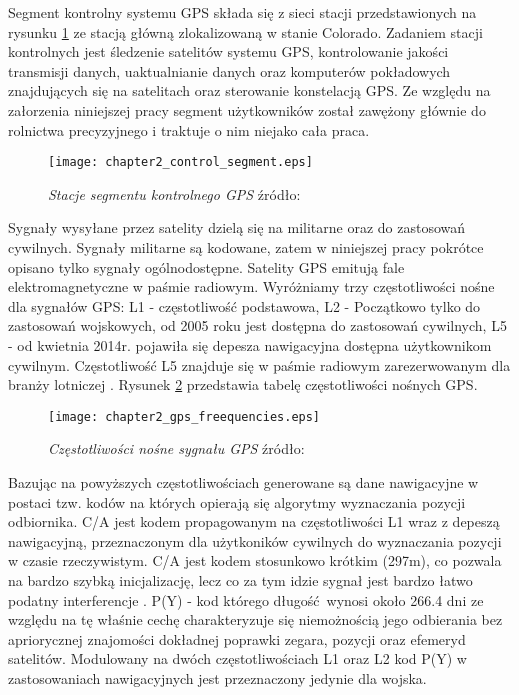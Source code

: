 \indent Segment kontrolny systemu GPS składa się z sieci stacji przedstawionych na rysunku \ref{fig:gps_control_segment} ze stacją główną zlokalizowaną w stanie Colorado.
Zadaniem stacji kontrolnych jest śledzenie satelitów systemu GPS, kontrolowanie jakości transmisji danych, uaktualnianie danych oraz komputerów pokładowych znajdujących się
na satelitach oraz sterowanie konstelacją GPS. Ze względu na załorzenia niniejszej pracy segment użytkowników został zawężony głównie do rolnictwa precyzyjnego i traktuje o
nim niejako cała praca.
\begin{figure}[H]
\centering
\texttt{[image: chapter2\_control\_segment.eps]}
\caption{\textit{Stacje segmentu kontrolnego GPS} źródło: \cite[]{GPS_GOV}}
\label{fig:gps_control_segment}
\end{figure}
\indent Sygnały wysyłane przez satelity dzielą się na militarne oraz do zastosowań cywilnych. Sygnały militarne są kodowane, zatem w niniejszej pracy pokrótce opisano
tylko sygnały ogólnodostępne. Satelity GPS emitują fale elektromagnetyczne w paśmie radiowym. Wyróżniamy trzy częstotliwości nośne dla sygnałów GPS: 
L1 - częstotliwość podstawowa, L2 - Początkowo tylko do zastosowań wojskowych, od 2005 roku jest dostępna do zastosowań cywilnych, L5 - od kwietnia 2014r. pojawiła się 
depesza nawigacyjna dostępna użytkownikom cywilnym. Częstotliwość L5 znajduje się w paśmie radiowym zarezerwowanym dla branży lotniczej \cite[]{GPS_GOV}.
Rysunek \ref{fig:gps_freequencies} przedstawia tabelę częstotliwości nośnych GPS.
\begin{figure}[H]
\centering
\texttt{[image: chapter2\_gps\_freequencies.eps]}
\caption{\textit{Częstotliwości nośne sygnału GPS} źródło: \cite[][strona 329]{hofmann_gnss}}
\label{fig:gps_freequencies}
\end{figure}
\noindent Bazując na powyższych częstotliwościach generowane są dane nawigacyjne w postaci tzw. kodów na których opierają się algorytmy wyznaczania pozycji odbiornika.
C/A jest kodem propagowanym na częstotliwości L1 wraz z depeszą nawigacyjną, przeznaczonym dla użytkoników cywilnych do wyznaczania pozycji w czasie rzeczywistym.
C/A jest kodem stosunkowo krótkim (297m), co pozwala na bardzo szybką inicjalizację,
lecz co za tym idzie sygnał jest bardzo łatwo podatny interferencje \cite[][strona 332]{hofmann_gnss}.
P(Y) - kod którego długość wynosi około 266.4 dni ze względu na tę właśnie cechę charakteryzuje się niemożnością jego odbierania bez apriorycznej znajomości dokładnej 
poprawki zegara, pozycji oraz efemeryd satelitów. Modulowany na dwóch częstotliwościach L1 oraz L2 kod P(Y) w zastosowaniach nawigacyjnych jest przeznaczony jedynie dla wojska.
